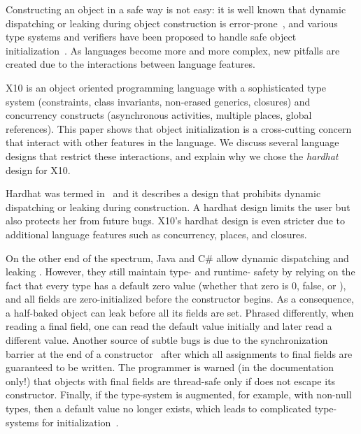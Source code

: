 Constructing an object in a safe way is not easy:
    it is well known that dynamic dispatching
    or leaking \this during object construction
    is error-prone~\cite{Dean:1996,Seo:2007:SBD:1522565.1522587,Gil:2009:WRS:1615184.1615216},
    and various type systems and verifiers have been proposed to
    handle safe object initialization~\cite{Hubert:2010:ESO:1888881.1888890,Zibin:2010:OIG:1869459.1869509,Fahndrich:2007:EOI:1297027.1297052,XinQi:2009}.
As languages become more and more complex,
    new pitfalls are created due to the interactions between
    language features.

X10 is an object oriented programming language with a sophisticated
    type system (constraints, class invariants, non-erased generics, closures)
    and concurrency constructs (asynchronous activities, multiple places, global references).
This paper shows that object initialization is a cross-cutting concern
    that interact with other features in the language.
We discuss several language designs that restrict these interactions,
    and explain why we chose the \emph{hardhat} design for X10.

{Hardhat} was termed in~\cite{Gil:2009:WRS:1615184.1615216}
    and it describes a design that prohibits dynamic dispatching or leaking \this during construction.
A hardhat design limits the user
    but also protects her from future bugs.
X10's hardhat design is even stricter due to additional language features
    such as concurrency, places, and closures.

On the other end of the spectrum,
    Java and C\# allow
    dynamic dispatching and leaking \this.
However, they still maintain type- and runtime- safety
    by relying on the fact that every type has a default zero value
    (whether that zero is 0, false, or ),
    and all fields are zero-initialized before the constructor begins.
As a consequence,
    a half-baked object can leak before all its fields are set. %
Phrased differently,
    when reading a final field, one can read the default value initially and later read a different value.
Another source of subtle bugs is due to the synchronization barrier
    at the end of a constructor~\cite{JSR133}
    after which all assignments to final fields are guaranteed to be written.
The programmer is warned (in the documentation only!)
    that objects with final fields are thread-safe only if
    \this does not escape its constructor.
Finally, if the type-system is augmented, for example, with non-null types, then
    a default value no longer exists,
    which leads to complicated type-systems for initialization~\cite{Fahndrich:2007:EOI:1297027.1297052,XinQi:2009}.

